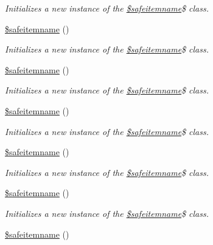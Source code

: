 \begin{DoxyCompactItemize}
\begin{DoxyCompactList}\small\item\em Initializes a new instance of the \hyperlink{class_0Brootnamespace_1_1_0Bsafeitemname}{\$safeitemname}\$ class. \end{DoxyCompactList}\item 
\hyperlink{class_0Brootnamespace_1_1_0Bsafeitemname_abbf88d241ae254db33a6740dee265a73}{\$safeitemname} ()
\begin{DoxyCompactList}\small\item\em Initializes a new instance of the \hyperlink{class_0Brootnamespace_1_1_0Bsafeitemname}{\$safeitemname}\$ class. \end{DoxyCompactList}\item 
\hyperlink{class_0Brootnamespace_1_1_0Bsafeitemname_abbf88d241ae254db33a6740dee265a73}{\$safeitemname} ()
\begin{DoxyCompactList}\small\item\em Initializes a new instance of the \hyperlink{class_0Brootnamespace_1_1_0Bsafeitemname}{\$safeitemname}\$ class. \end{DoxyCompactList}\item 
\hyperlink{class_0Brootnamespace_1_1_0Bsafeitemname_abbf88d241ae254db33a6740dee265a73}{\$safeitemname} ()
\begin{DoxyCompactList}\small\item\em Initializes a new instance of the \hyperlink{class_0Brootnamespace_1_1_0Bsafeitemname}{\$safeitemname}\$ class. \end{DoxyCompactList}\item 
\hyperlink{class_0Brootnamespace_1_1_0Bsafeitemname_abbf88d241ae254db33a6740dee265a73}{\$safeitemname} ()
\begin{DoxyCompactList}\small\item\em Initializes a new instance of the \hyperlink{class_0Brootnamespace_1_1_0Bsafeitemname}{\$safeitemname}\$ class. \end{DoxyCompactList}\item 
\hyperlink{class_0Brootnamespace_1_1_0Bsafeitemname_abbf88d241ae254db33a6740dee265a73}{\$safeitemname} ()
\begin{DoxyCompactList}\small\item\em Initializes a new instance of the \hyperlink{class_0Brootnamespace_1_1_0Bsafeitemname}{\$safeitemname}\$ class. \end{DoxyCompactList}\item 
\hyperlink{class_0Brootnamespace_1_1_0Bsafeitemname_abbf88d241ae254db33a6740dee265a73}{\$safeitemname} ()

\end{DoxyCompactItemize}
